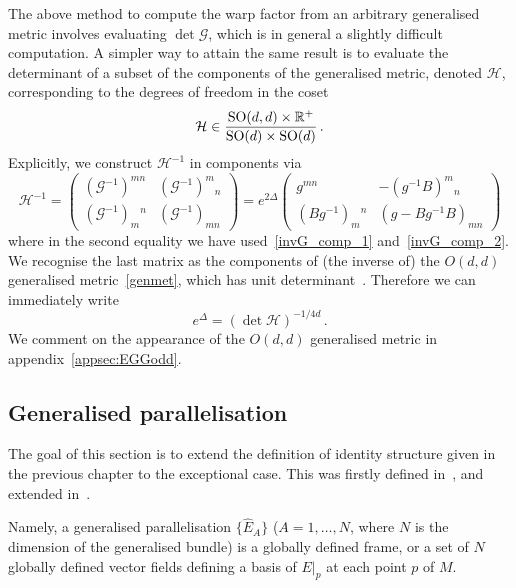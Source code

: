 \documentclass[debug]{phd}
\begin{document}
					The above method to compute the warp factor from an arbitrary generalised metric involves evaluating $\det \mathcal{G}$, which is in general a slightly difficult computation. 
					A simpler way to attain the same result is to evaluate the determinant of a subset of the components of the generalised metric, denoted $\mathcal{H}$, corresponding to the degrees of freedom in the coset
							\begin{equation}
								\mathcal{H} \in \frac{\mathrm{SO}(d,d)\times\mathbb{R}^+}{\mathrm{SO}(d)\times\mathrm{SO}(d)}\,.
							\end{equation}
					Explicitly, we construct $\mathcal{H}^{-1}$ in components via
							\begin{equation}\label{eq:GB-metric}
									\mathcal{H}^{-1} = \begin{pmatrix} (\mathcal{G}^{-1})^{mn} & (\mathcal{G}^{-1})^m{}_n \\
		 														(\mathcal{G}^{-1})_m{}^n & (\mathcal{G}^{-1})_{mn} \end{pmatrix}
		 										= e^{2\Delta} \begin{pmatrix} g^{mn} & -(g^{-1} B)^m{}_n \\
		 														(B g^{-1})_m{}^n & (g - B g^{-1} B)_{mn} \end{pmatrix}
							\end{equation}
					where in the second equality we have used~\eqref{invG_comp_1} and~\eqref{invG_comp_2}. 
					We recognise the last matrix as the components of (the inverse of) the $O(d,d)$ generalised metric~\eqref{genmet}, which has unit determinant~\cite{gualtphd}. 
					Therefore we can immediately write
							\begin{equation}
								e^{\Delta} = (\det \mathcal{H})^{-1/4d} \, .
							\end{equation}
					We comment on the appearance of the $O(d,d)$ generalised metric in appendix~\ref{appsec:EGGodd}.
			\subsection{Generalised parallelisation}\label{secGenPar}
					The goal of this section is to extend the definition of identity structure given in the previous chapter to the exceptional case.
					This was firstly defined in~\cite{spheres}, and extended in~\cite{oscar1}.
					
					Namely, a generalised parallelisation $\{\hat{E}_A\}$ ($A = 1, \ldots , N$, where $N$ is the dimension of the generalised bundle) is a globally defined frame, or a set of $N$ globally defined vector fields defining a basis of $E\vert_p$ at each point $p$ of $M$.
					
\end{document}
